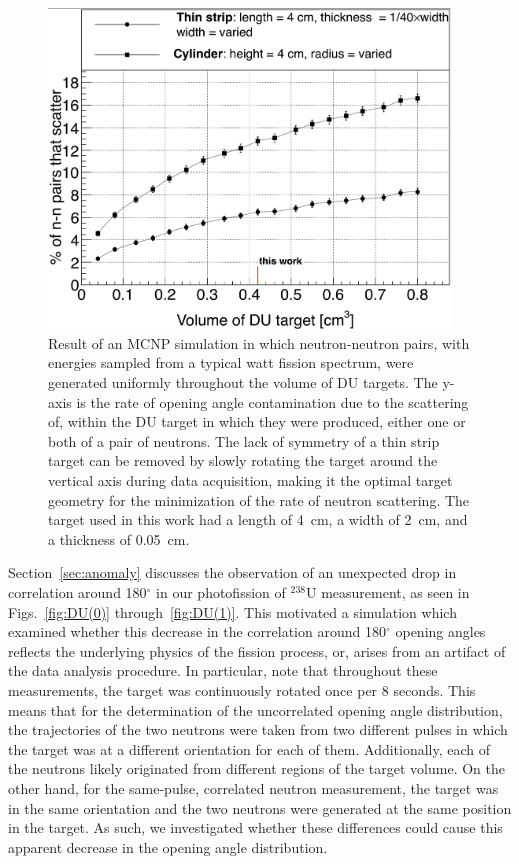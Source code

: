 \begin{figure}
    \centering
    \includegraphics[width = 0.95\textwidth]{Content/Errors/ElasticScatteringPlot.png}
    \caption{
     Result of an MCNP simulation in which neutron-neutron pairs, with energies sampled from a typical watt fission spectrum, were generated uniformly throughout the volume of DU targets.
        The y-axis is the rate of opening angle contamination due to the scattering of, within the DU target in which they were produced, either one or both of a pair of neutrons.
    The lack of symmetry of a thin strip target can be removed by slowly rotating the target around the vertical axis during data acquisition, making it the optimal target geometry for the minimization of the rate of neutron scattering.
    The target used in this work had a length of 4~cm, a width of 2~cm, and a thickness of 0.05~cm.
    }
    \label{fig:ElasticScatteringPlot}
\end{figure}

Section~\ref{sec:anomaly} discusses the observation of an unexpected drop in correlation around 180$^{\circ}$ in our photofission of $^{238}$U measurement, as seen in Figs.~\ref{fig:DU(0)} through~\ref{fig:DU(1)}.
This motivated a simulation which examined whether this decrease in the correlation around 180$^{\circ}$ opening angles reflects the underlying physics of the fission process, or, arises from an artifact of the data analysis procedure.
In particular, note that throughout these measurements, the target was continuously rotated once per 8 seconds.
This means that for the determination of the uncorrelated opening angle distribution, the trajectories of the two neutrons were taken from two different pulses in which the target was at a different orientation for each of them.
Additionally, each of the neutrons likely originated from different regions of the target volume.
On the other hand, for the same-pulse, correlated neutron measurement, the target was in the same orientation and the two neutrons were generated at the same position in the target.
As such, we investigated whether these differences could cause this apparent decrease in the opening angle distribution.

